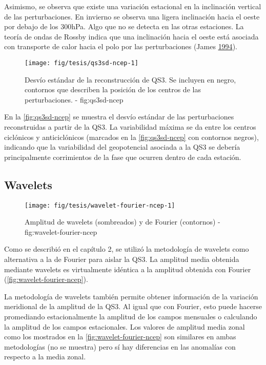 \documentclass[spanish,a4paper,12p]{book}
\begin{document}
Asimismo, se observa que existe una variación estacional en la
inclinación vertical de las perturbaciones. En invierno se observa una
ligera inclinación hacia el oeste por debajo de los 300hPa. Algo que no
se detecta en las otras estaciones. La teoría de ondas de Rossby indica
que una inclinación hacia el oeste está asociada con transporte de calor
hacia el polo por las perturbaciones (James
\protect\hyperlink{ref-James}{1994}).

\begin{figure*}
\texttt{[image: fig/tesis/qs3sd-ncep-1]} \caption{Desvío estándar de la reconstrucción de QS3. Se incluyen en negro, contornos que describen la posición de los centros de las perturbaciones. - fig:qs3sd-ncep}\label{fig:qs3sd-ncep}
\end{figure*}

En la \autoref{fig:qs3sd-ncep} se muestra el desvío estándar de las
perturbaciones reconstruidas a partir de la QS3. La variabilidad máxima
se da entre los centros ciclónicos y anticiclónicos (marcados en la
\autoref{fig:qs3sd-ncep} con contornos negros), indicando que la
variabilidad del geopotencial asociada a la QS3 se debería
principalmente corrimientos de la fase que ocurren dentro de cada
estación.

\subsection{Wavelets}\label{wavelets}

\begin{figure}

{\centering \texttt{[image: fig/tesis/wavelet-fourier-ncep-1]} 

}

\caption{Amplitud de wavelets (sombreados) y de Fourier (contornos) - fig:wavelet-fourier-ncep}\label{fig:wavelet-fourier-ncep}
\end{figure}

Como se describió en el capítulo 2, se utilizó la metodología de
wavelets como alternativa a la de Fourier para aislar la QS3. La
amplitud media obtenida mediante wavelets
 es virtualmente idéntica a la
amplitud obtenida con Fourier (\autoref{fig:wavelet-fourier-ncep}).

La metodología de wavelets también permite obtener información de la
variación meridional de la amplitud de la QS3. Al igual que con Fourier,
esto puede hacerse promediando estacionalmente la amplitud de los campos
mensuales o calculando la amplitud de los campos estacionales. Los
valores de amplitud media zonal como los mostrados en la
\autoref{fig:wavelet-fourier-ncep} son similares en ambas metodologías
(no se muestra) pero sí hay diferencias en las anomalías con respecto a
la media zonal.
\end{document}
